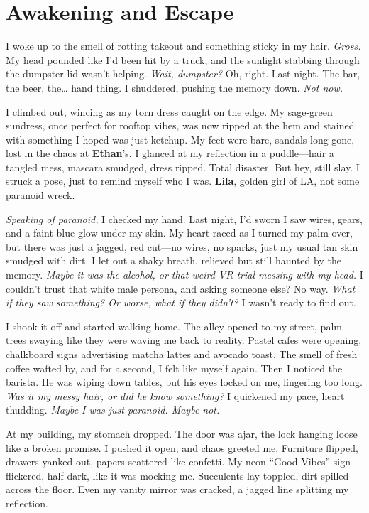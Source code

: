 \documentclass{article}
\begin{document}
\section*{Awakening and Escape}

I woke up to the smell of rotting takeout and something sticky in my hair. \textit{Gross.} My head pounded like I’d been hit by a truck, and the sunlight stabbing through the dumpster lid wasn’t helping. \textit{Wait, dumpster?} Oh, right. Last night. The bar, the beer, the… hand thing. I shuddered, pushing the memory down. \textit{Not now.}

I climbed out, wincing as my torn dress caught on the edge. My sage-green sundress, once perfect for rooftop vibes, was now ripped at the hem and stained with something I hoped was just ketchup. My feet were bare, sandals long gone, lost in the chaos at \textbf{Ethan}’s. I glanced at my reflection in a puddle—hair a tangled mess, mascara smudged, dress ripped. Total disaster. But hey, still slay. I struck a pose, just to remind myself who I was. \textbf{Lila}, golden girl of LA, not some paranoid wreck.

\textit{Speaking of paranoid,} I checked my hand. Last night, I’d sworn I saw wires, gears, and a faint blue glow under my skin. My heart raced as I turned my palm over, but there was just a jagged, red cut—no wires, no sparks, just my usual tan skin smudged with dirt. I let out a shaky breath, relieved but still haunted by the memory. \textit{Maybe it was the alcohol, or that weird VR trial messing with my head.} I couldn’t trust that white male persona, and asking someone else? No way. \textit{What if they saw something? Or worse, what if they didn’t?} I wasn’t ready to find out.

I shook it off and started walking home. The alley opened to my street, palm trees swaying like they were waving me back to reality. Pastel cafes were opening, chalkboard signs advertising matcha lattes and avocado toast. The smell of fresh coffee wafted by, and for a second, I felt like myself again. Then I noticed the barista. He was wiping down tables, but his eyes locked on me, lingering too long. \textit{Was it my messy hair, or did he know something?} I quickened my pace, heart thudding. \textit{Maybe I was just paranoid. Maybe not.}

At my building, my stomach dropped. The door was ajar, the lock hanging loose like a broken promise. I pushed it open, and chaos greeted me. Furniture flipped, drawers yanked out, papers scattered like confetti. My neon “Good Vibes” sign flickered, half-dark, like it was mocking me. Succulents lay toppled, dirt spilled across the floor. Even my vanity mirror was cracked, a jagged line splitting my reflection.
\end{document}
